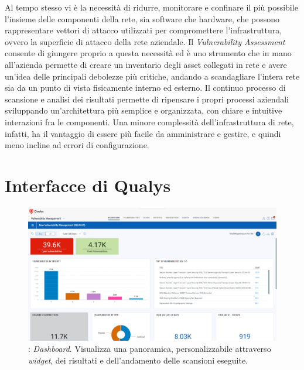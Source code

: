 \documentclass[target=bach,aauheader=]{thud}
\begin{document}
Al tempo stesso vi è la necessità di ridurre, monitorare e confinare il più possibile l'insieme delle componenti della rete, sia software che hardware, che possono rappresentare vettori di attacco utilizzati per compromettere l'infrastruttura, ovvero la superficie di attacco della rete aziendale. Il \textit{Vulnerability Assessment} consente di giungere proprio a questa necessità ed è uno strumento che in mano all'azienda permette di creare un inventario degli asset collegati in rete e avere un'idea delle principali debolezze più critiche, andando a scandagliare l'intera rete sia da un punto di vista fisicamente interno ed esterno. Il continuo processo di scansione e analisi dei risultati permette di ripensare i propri processi aziendali sviluppando un'architettura più semplice e organizzata, con chiare e intuitive interazioni fra le componenti. Una minore complessità dell'infrastruttura di rete, infatti, ha il vantaggio di essere più facile da amministrare e gestire, e quindi meno incline ad errori di configurazione.


\appendix


\chapter{Interfacce di Qualys}
\label{appendix:a}

\begin{figure}[h]
\centering
    \includegraphics[scale=0.329]{images/qualys_dashboard.png}
    \caption{: \textit{Dashboard}. Visualizza una panoramica, personalizzabile attraverso \textit{widget}, dei risultati e dell'andamento delle scansioni eseguite.}
\end{figure}
\end{document}
